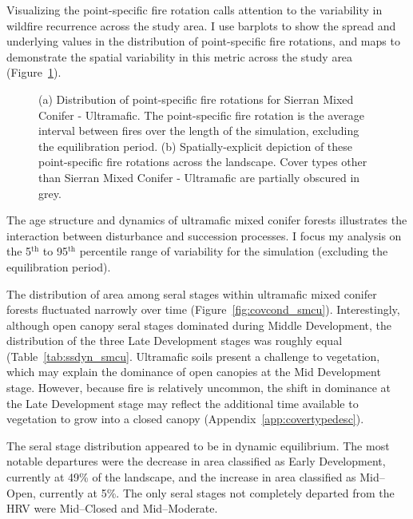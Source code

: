 Visualizing the point-specific fire rotation calls attention to the variability in wildfire recurrence across the study area. I use barplots to show the spread and underlying values in the distribution of point-specific fire rotations, and maps to demonstrate the spatial variability in this metric across the study area (Figure~\ref{fig:preturn_smcu}).

\begin{figure}[!htbp]
  \centering
  \caption{(a) Distribution of point-specific fire rotations for Sierran Mixed Conifer - Ultramafic. The point-specific fire rotation is the average interval between fires over the length of the simulation, excluding the equilibration period. (b) Spatially-explicit depiction of these point-specific fire rotations across the landscape. Cover types other than Sierran Mixed Conifer - Ultramafic are partially obscured in grey.}
\label{fig:preturn_smcu}
\end{figure}

The age structure and dynamics of ultramafic mixed conifer forests illustrates the interaction between disturbance and succession processes. I focus my analysis on the 5$^{\text{th}}$ to 95$^{\text{th}}$ percentile range of variability for the simulation (excluding the equilibration period). %

The distribution of area among seral stages within ultramafic mixed conifer forests fluctuated narrowly over time (Figure~\ref{fig:covcond_smcu}). Interestingly, although open canopy seral stages dominated during Middle Development, the distribution of the three Late Development stages was roughly equal (Table~\ref{tab:ssdyn_smcu}. Ultramafic soils present a challenge to vegetation, which may explain the dominance of open canopies at the Mid Development stage. However, because fire is relatively uncommon, the shift in dominance at the Late Development stage may reflect the additional time available to vegetation to grow into a closed canopy (Appendix~\ref{app:covertypedesc}). %

The seral stage distribution appeared to be in dynamic equilibrium. The most notable departures were the decrease in area classified as Early Development, currently at 49\% of the landscape, and the increase in area classified as Mid--Open, currently at 5\%. The only seral stages not completely departed from the HRV were Mid--Closed and Mid--Moderate.

